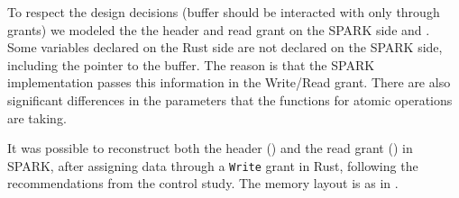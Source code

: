 \documentclass[nomenclature, english, bibtex]{kththesis}
\begin{document}
To respect the design decisions (buffer should be interacted with only through grants) we modeled the the header and read grant on the SPARK side  and . Some variables declared on the Rust side are not declared on the SPARK side, including the pointer to the buffer. The reason is that the SPARK implementation passes this information in the Write/Read grant. There are also significant differences in the parameters that the functions for atomic operations are taking.

It was possible to reconstruct both the header () and the read grant () in SPARK, after assigning data through a \texttt{Write} grant in Rust, following the recommendations from the control study. The memory layout is as in .
\end{document}
